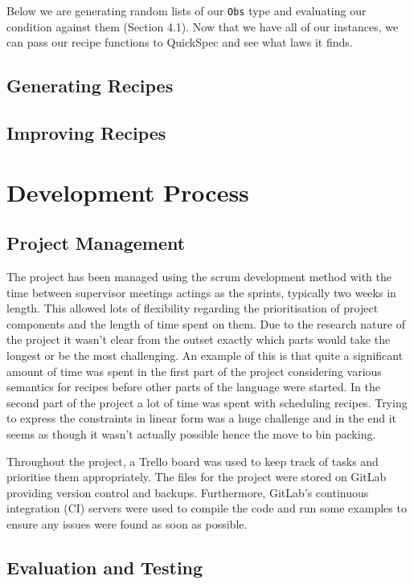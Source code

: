 \documentclass[11pt]{article}
\begin{document}
Below we are generating random lists of our \texttt{Obs} type and evaluating our
condition against them (Section 4.1). Now that we have all of our instances,
we can pass our recipe functions to QuickSpec and see what laws it finds.

\subsection{Generating Recipes}

\subsection{Improving Recipes}

\section{Development Process}

\subsection{Project Management}

The project has been managed using the scrum development method with the time
between supervisor meetings actings as the sprints, typically two weeks in length.
This allowed lots of flexibility regarding the prioritisation of project
components and the length of time spent on them. Due to the research nature
of the project it wasn't clear from the outset exactly which parts would take the
longest or be the most challenging. An example of this is that
quite a significant amount of time was spent in the first part of the project
considering various semantics for recipes before other parts of the language
were started. In the second part of the project a lot of time was spent
with scheduling recipes. Trying to express the constraints in linear form
was a huge challenge and in the end it seems as though it wasn't actually possible
hence the move to bin packing.

\medbreak

Throughout the project, a Trello board was used to keep track of tasks
and prioritise them appropriately. The files for the project were stored
on GitLab providing version control and backups. Furthermore, GitLab's
continuous integration (CI) servers were used to compile the code and run
some examples to ensure any issues were found as soon as possible.

\subsection{Evaluation and Testing}
\end{document}
